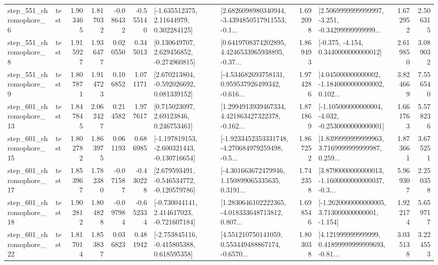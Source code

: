 \begin{tabular}{llrrrrllrlrr}
   step\_551\_chromophore\_6 &      test &      1.903465 &    1.817032 &     -0.086432 & -0.555140 &     [-1.635512375, 2.11644979, 0.302284125] &  [2.6826098980340944, -3.4394850517911553, -0.1... &       1.692098 &  [2.5069999999999997, -3.251, -0.34299999999999... &            1.672952 &          2.506315 \\
   step\_551\_chromophore\_8 &      test &      1.915927 &    1.936477 &      0.020550 &  0.345013 &    [0.130649707, 2.629456852, -0.274960815] &  [0.6419708374202895, 4.4246533965938895, -0.37... &       1.869493 &               [-0.375, -4.154, 0.3440000000000012] &            2.619850 &          3.089032 \\
   step\_551\_chromophore\_9 &      test &      1.807871 &    1.914723 &      0.106852 &  1.071171 &    [2.670213804, -0.592026692, 0.081339152] &  [-4.534682693758131, 0.959537926499342, -0.616... &       1.974286 &  [4.045000000000002, -1.1840000000000002, 0.102... &            3.824669 &          7.556540 \\
  step\_601\_chromophore\_13 &      test &      1.847845 &    2.062427 &      0.214582 &  1.977617 &      [0.715023097, 2.69123846, 0.246753461] &  [1.2994913939467334, 4.421863427322378, -0.162... &       1.871869 &  [-1.105000000000004, -4.032, -0.2530000000000001] &            1.661763 &          5.578236 \\
  step\_601\_chromophore\_15 &      test &      1.802782 &    1.863975 &      0.061193 &  0.686985 &  [-1.197819153, -2.600321443, -0.130716654] &  [-1.9233452353331748, -4.270684979259498, -0.5... &       1.867252 &  [1.8399999999999963, 3.7169999999999987, 0.259... &            1.873661 &          3.675251 \\
  step\_601\_chromophore\_17 &      test &      1.853967 &    1.782380 &     -0.071587 & -0.430228 &   [2.679593491, -0.546534772, -0.120579786] &  [-4.301663672479946, 1.150899065335635, 0.3191... &       1.742358 &  [3.8790000000000013, -1.1600000000000037, -0.3... &            5.969307 &          2.250358 \\
  step\_601\_chromophore\_18 &      test &      1.902812 &    1.804828 &     -0.097984 & -0.652334 &   [-0.730044141, 2.414617023, -0.721607184] &  [1.2830646102222365, -4.018333648713812, 0.807... &       1.698546 &   [-1.2620000000000005, 3.713000000000001, -1.154] &            1.922174 &          5.659717 \\
  step\_601\_chromophore\_22 &      test &      1.817014 &    1.853837 &      0.036823 &  0.481942 &   [-2.753845116, -0.415805388, 0.618595358] &  [4.551210750141059, 0.553449488867174, -0.6570... &       1.803038 &  [4.121999999999999, 0.41899999999999693, -0.81... &            3.035138 &          3.224553 \\

\end{tabular}
